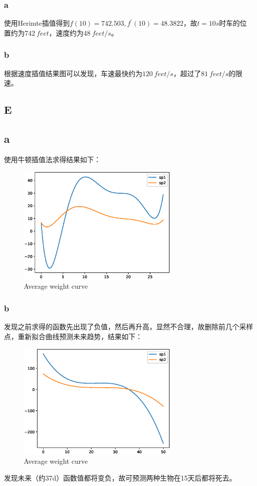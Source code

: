 \documentclass[12]{article}%
\begin{document}
            \subsubsection{a}
                使用Herimte插值得到$f(10)=742.503,f^{'}(10)=48.3822$，故$t=10s$时车的位置约为$742\ feet$，速度约为$48\ feet/s$。
            \subsubsection{b}
                根据速度插值结果图可以发现，车速最快约为$120\ feet/s$，超过了$81\ feet/s$的限速。
        
        \subsection{E}
            \subsection{a}
                使用牛顿插值法求得结果如下：
                \begin{figure}[H]
                    \centering
                    \includegraphics[width=0.7\textwidth]{./pic/E_1.eps}
                    \caption{Average weight curve}
                \end{figure}
            \subsubsection{b}
                发现之前求得的函数先出现了负值，然后再升高，显然不合理，故删除前几个采样点，重新拟合曲线预测未来趋势，结果如下：
                
                \begin{figure}[H]
                    \centering
                    \includegraphics[width=0.7\textwidth]{./pic/E_2.eps}
                    \caption{Average weight curve}
                \end{figure}
                
                发现未来（约37d）函数值都将变负，故可预测两种生物在15天后都将死去。
\end{document}
